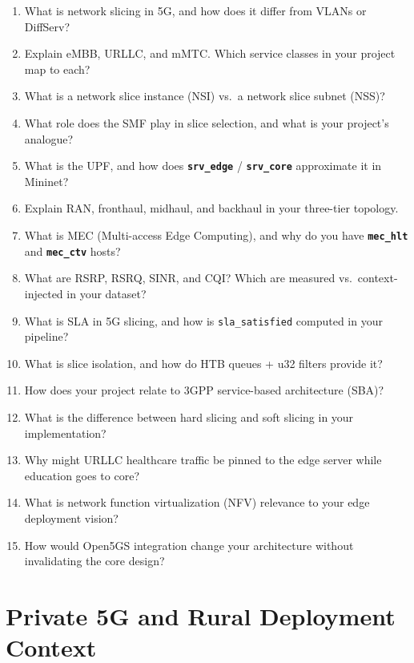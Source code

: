 \documentclass[11pt,a4paper]{article}
\newcommand{\proj}[1]{\textbf{\texttt{#1}}}
\begin{document}
\begin{enumerate}
    \item What is network slicing in 5G, and how does it differ from VLANs or DiffServ?
    \item Explain eMBB, URLLC, and mMTC. Which service classes in your project map to each?
    \item What is a network slice instance (NSI) vs.\ a network slice subnet (NSS)?
    \item What role does the SMF play in slice selection, and what is your project's analogue?
    \item What is the UPF, and how does \proj{srv\_edge} / \proj{srv\_core} approximate it in Mininet?
    \item Explain RAN, fronthaul, midhaul, and backhaul in your three-tier topology.
    \item What is MEC (Multi-access Edge Computing), and why do you have \proj{mec\_hlt} and \proj{mec\_ctv} hosts?
    \item What are RSRP, RSRQ, SINR, and CQI? Which are measured vs.\ context-injected in your dataset?
    \item What is SLA in 5G slicing, and how is \texttt{sla\_satisfied} computed in your pipeline?
    \item What is slice isolation, and how do HTB queues + u32 filters provide it?
    \item How does your project relate to 3GPP service-based architecture (SBA)?
    \item What is the difference between hard slicing and soft slicing in your implementation?
    \item Why might URLLC healthcare traffic be pinned to the edge server while education goes to core?
    \item What is network function virtualization (NFV) relevance to your edge deployment vision?
    \item How would Open5GS integration change your architecture without invalidating the core design?
\end{enumerate}

\section{Private 5G and Rural Deployment Context}
\end{document}
